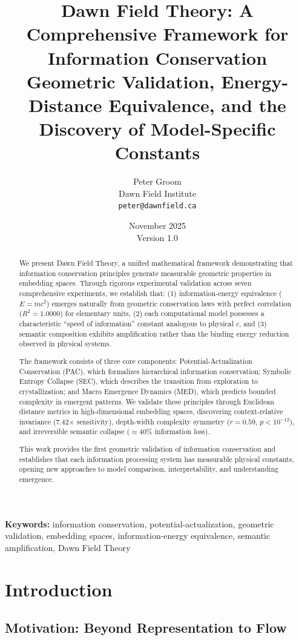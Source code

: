 \documentclass[11pt,a4paper]{article}
\title{\textbf{Dawn Field Theory: A Comprehensive Framework for Information Conservation}\\ 
\large{Geometric Validation, Energy-Distance Equivalence, and the Discovery of Model-Specific Constants}}
\author{Peter Groom\\
Dawn Field Institute\\
\texttt{peter@dawnfield.ca}}
\date{November 2025\\Version 1.0}
\begin{document}
\maketitle

\begin{abstract}
We present Dawn Field Theory, a unified mathematical framework demonstrating that information conservation principles generate measurable geometric properties in embedding spaces. Through rigorous experimental validation across seven comprehensive experiments, we establish that: (1) information-energy equivalence ($E=mc^2$) emerges naturally from geometric conservation laws with perfect correlation ($R^2=1.0000$) for elementary units, (2) each computational model possesses a characteristic ``speed of information'' constant analogous to physical $c$, and (3) semantic composition exhibits amplification rather than the binding energy reduction observed in physical systems. 

The framework consists of three core components: Potential-Actualization Conservation (PAC), which formalizes hierarchical information conservation; Symbolic Entropy Collapse (SEC), which describes the transition from exploration to crystallization; and Macro Emergence Dynamics (MED), which predicts bounded complexity in emergent patterns. We validate these principles through Euclidean distance metrics in high-dimensional embedding spaces, discovering context-relative invariance (7.42$\times$ sensitivity), depth-width complexity symmetry ($r=0.59$, $p<10^{-12}$), and irreversible semantic collapse ($\approx 40\%$ information loss). 

This work provides the first geometric validation of information conservation and establishes that each information processing system has measurable physical constants, opening new approaches to model comparison, interpretability, and understanding emergence.
\end{abstract}

\textbf{Keywords:} information conservation, potential-actualization, geometric validation, embedding spaces, information-energy equivalence, semantic amplification, Dawn Field Theory

\section{Introduction}

\subsection{Motivation: Beyond Representation to Flow}
\end{document}
